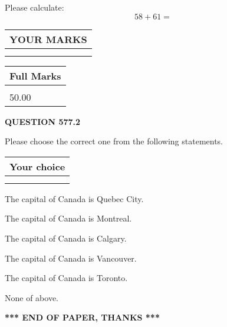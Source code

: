 \documentclass[12pt]{article}
\begin{document}
  
 
Please calculate:
\begin{equation}
58 +  %
61 = \nonumber
\end{equation}
 

 

 
  
\vspace{0.2in}
  
\noindent\begin{tabular}{|l|}
\hline
 YOUR MARKS  \\
\hline
 \\ 
 \\ 
\hline
\end{tabular}
\hspace{0.05in} \begin{tabular}{|l|}
\hline
 Full Marks  \\
\hline
 \\ 
50.00 \\
\hline
\end{tabular}
{\textbf{\Large{QUESTION
577.2 
}}}
  
  
Please choose the correct one from the following statements.
  
  
\noindent\hspace{3.0in} \begin{tabular}{|l|}
\hline
Your choice \\
\hline
 \\ 
 \\ 
\hline
\end{tabular}
  
  
 
 
The capital of Canada is Quebec City.
 
 
The capital of Canada is Montreal.
 
 
The capital of Canada is Calgary.
 
 
The capital of Canada is Vancouver.
 
 
The capital of Canada is Toronto.
 
 
 None of above.
 
 
   
   
 \vspace{0.2in}
 
   
   
   
   
\vspace{1.0in} 
{\textbf{\large{ *** END OF PAPER, THANKS *** }}} 
   
\end{document}
